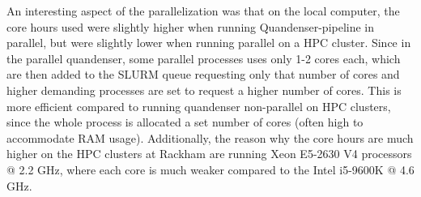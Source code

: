 \documentclass[11pt]{article}
\begin{document}
An interesting aspect of the parallelization was that on the local computer, the core hours used were slightly higher when running Quandenser-pipeline in parallel, but were slightly lower when running parallel on a HPC cluster. Since in the parallel quandenser, some parallel processes uses only 1-2 cores each, which are then added to the SLURM queue requesting only that number of cores and higher demanding processes are set to request a higher number of cores. This is more efficient compared to running quandenser non-parallel on HPC clusters, since the whole process is allocated a set number of cores (often high to accommodate RAM usage). Additionally, the reason why the core hours are much higher on the HPC clusters at Rackham are running Xeon E5-2630 V4 processors @ 2.2 GHz, where each core is much weaker compared to the Intel i5-9600K @ 4.6 GHz.

\end{document}
